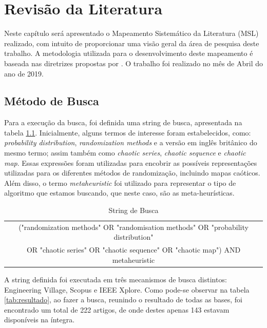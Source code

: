 
\chapter{Revisão da Literatura} \label{chap2}

Neste capítulo será apresentado o Mapeamento Sistemático da Literatura (MSL) realizado, com intuito de proporcionar uma visão geral da área de pesquisa deste trabalho. A metodologia utilizada para o desenvolvimento deste mapeamento é baseada nas diretrizes propostas por \cite{petersen}. O trabalho foi realizado no mês de Abril do ano de 2019.

\section{Método de Busca}

Para a execução da busca, foi definida uma string de busca, apresentada na tabela \ref{tab:string}. Inicialmente, alguns termos de interesse foram estabelecidos, como: \textit{probability distribution}, \textit{randomization methods} e a versão em inglês britânico do mesmo termo; assim também como \textit{chaotic series}, \textit{chaotic sequence} e \textit{chaotic map}. Essas expressões foram utilizadas para encobrir as possíveis representações utilizadas para os diferentes métodos de randomização, incluindo mapas caóticos. Além disso, o termo \textit{metaheuristic} foi utilizado para representar o tipo de algoritmo que estamos buscando, que neste caso, são as meta-heurísticas.

\begin{table}[!htpb]
    \centering
    \begin{tabular}{|c|}
    \hline
        ("randomization methods" OR "randomisation methods" OR "probability distribution"\\OR "chaotic series" OR "chaotic sequence" OR "chaotic map") AND metaheuristic \\
    \hline
    \end{tabular}
    \caption{String de Busca}
    \label{tab:string}
\end{table}


A string definida foi executada em três mecanismos de busca distintos: Engineering Village, Scopus e IEEE Xplore. Como pode-se observar na tabela \ref{tab:resultado}, ao fazer a busca, reunindo o resultado de todas as bases, foi encontrado um total de 222 artigos, de onde destes apenas 143 estavam disponíveis na íntegra.


